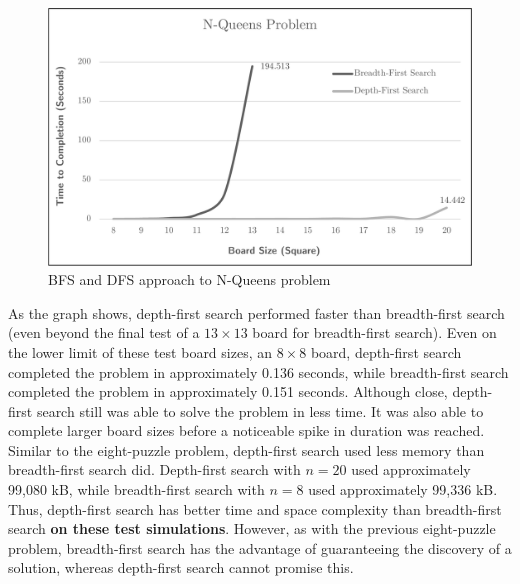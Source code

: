 \documentclass{article}
\begin{document}
    \begin{figure}[H]
      \centering
      \includegraphics[width=1\textwidth]{figure.png}
      \caption{BFS and DFS approach to N-Queens problem}
    \end{figure}

    As the graph shows, depth-first search performed faster than breadth-first search (even beyond the final test of a $13 \times 13$ board for breadth-first search). Even on the lower limit of these test board sizes, an $8 \times 8$ board, depth-first search completed the problem in approximately 0.136 seconds, while breadth-first search completed the problem in approximately 0.151 seconds. Although close, depth-first search still was able to solve the problem in less time. It was also able to complete larger board sizes before a noticeable spike in duration was reached. Similar to the eight-puzzle problem, depth-first search used less memory than breadth-first search did. Depth-first search with $n=20$ used approximately 99,080 kB, while breadth-first search with $n=8$ used approximately  99,336 kB. Thus, depth-first search has better time and space complexity than breadth-first search \textbf{on these test simulations}. However, as with the previous eight-puzzle problem, breadth-first search has the advantage of guaranteeing the discovery of a solution, whereas depth-first search cannot promise this.
\end{document}
